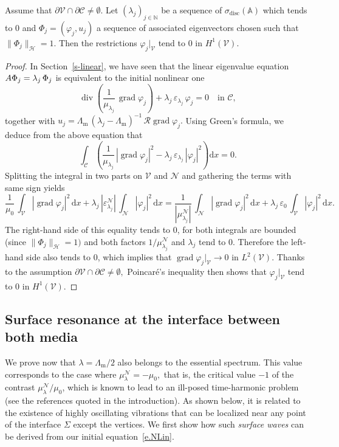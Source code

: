 \documentclass[AHL,Unicode,longabstracts]{cedram}
\DeclareMathOperator{\Div}{div}
\DeclareMathOperator{\grad}{grad}
\DeclareMathOperator{\disc}{disc}
\newcommand{\epsl}{\varepsilon}
\newcommand{\calC}{\mathcal{C}}
\newcommand{\calH}{\mathcal{H}}
\newcommand{\calN}{\mathcal{N}}
\newcommand{\calR}{\mathcal{R}}
\newcommand{\calV}{\mathcal{V}}
\newcommand{\bbA}{\mathbb{A}}
\newcommand{\bbN}{\mathbb{N}}
\newcommand{\rmd}{{\mathrm{d}}}
\newcommand{\Lm}{{\Lambda_{\mathrm{m}}}}
\begin{document}
\begin{prop}\label{prop3.4}
Assume that $\partial\calV \cap \partial\calC \neq \emptyset.$ Let $(\lambda_j)_{j \in \bbN}$ be a sequence of $\sigma_{\disc}(\bbA)$ which tends to $0$ and $\Phi_j = (\varphi_j,u_j)$ a sequence of associated eigenvectors chosen such that $\| \Phi_j \|_\calH = 1.$ Then the restrictions $\varphi_j|_\calV$ tend to $0$ in $H^1(\calV).$
\end{prop}

\begin{proof}
In Section~\ref{s-linear}, we have seen that the linear eigenvalue equation $A \Phi_j\linebreak= \lambda_j\,\Phi_j$ is equivalent to the initial nonlinear one
\[
\Div \left(\frac{1}{\mu_{\lambda_j}}\, \grad\varphi_j \right) + \lambda_j\,\epsl_{\lambda_j}\,\varphi_j = 0
\quad\text{in }\calC,
\]
together with $u_j = \Lm \, (\lambda_j-\Lm)^{-1} \, \calR \grad\varphi_j.$ Using Green's formula, we deduce from the above equation that
\[
\int_\calC \left(\frac{1}{\mu_{\lambda_j}}\, |\grad\varphi_j|^2 - \lambda_j\,\epsl_{\lambda_j}\,|\varphi_j|^2 \right) \rmd x = 0.
\]
Splitting the integral in two parts on $\calV$ and $\calN$ and gathering the terms with same sign yields
\[
\frac{1}{\mu_0}\,\int_\calV |\grad\varphi_j|^2 \,\rmd x +
\lambda_j\,|\epsl^\calN_{\lambda_j}| \,\int_\calN |\varphi_j|^2 \,\rmd x = \frac{1}{|\mu^\calN_{\lambda_j}|}\,\int_\calN |\grad\varphi_j|^2 \,\rmd x +
\lambda_j\,\epsl_0 \,\int_\calV |\varphi_j|^2 \,\rmd x.
\]
The right-hand side of this equality tends to 0, for both integrals are bounded (since $\| \Phi_j \|_\calH = 1)$ and both factors $1/\mu^\calN_{\lambda_j}$ and $\lambda_j$ tend to 0. Therefore the left-hand side also tends to 0, which implies that $\grad\varphi_j|_\calV \to 0$ in $L^2(\calV).$ Thanks to the assumption $\partial\calV \cap \partial\calC \neq \emptyset,$ Poincaré's inequality then shows that $\varphi_j|_\calV$ tend to $0$ in $H^1(\calV).$
\end{proof}

\subsection{Surface resonance at the interface between both media}\label{s-surface-reson}
We prove now that $\lambda = \Lm/2$ also belongs to the essential spectrum. This value corresponds to the case where $\mu_\lambda^\calN = -\mu_0,$ that is, the critical value $-1$ of the contrast $\mu_\lambda^\calN/\mu_0$, which is known to lead to an ill-posed time-harmonic problem (see the references quoted in the introduction). As shown below, it is related to the existence of highly oscillating vibrations that can be localized near any point of the interface $\Sigma$ except the vertices. We first show how such \emph{surface waves} can be derived from our initial equation~\eqref{e.NLin}.
\end{document}
